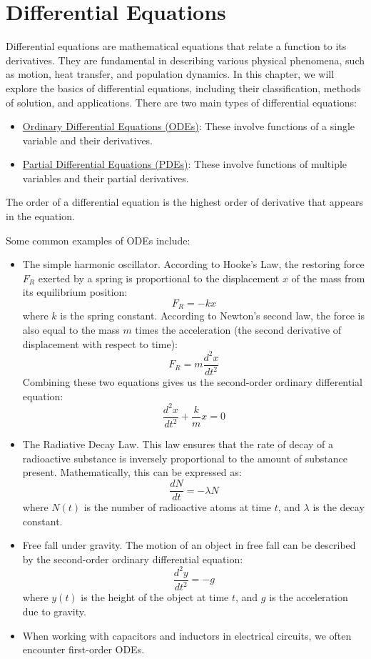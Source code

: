 \chapter{Differential Equations}

Differential equations are mathematical equations that relate a function to its derivatives. They are fundamental in describing various physical phenomena, such as motion, heat transfer, and population dynamics. In this chapter, we will explore the basics of differential equations, including their classification, methods of solution, and applications. There are two main types of differential equations: 
\begin{itemize}
    \item \ul{Ordinary Differential Equations (ODEs)}: These involve functions of a single variable and their derivatives.

    \item \ul{Partial Differential Equations (PDEs)}: These involve functions of multiple variables and their partial derivatives.
\end{itemize}

\begin{definicion}
The order of a differential equation is the highest order of derivative that appears in the equation.
\end{definicion}

Some common examples of ODEs include:
\begin{itemize}
    \item The simple harmonic oscillator. According to Hooke's Law, the restoring force $F_R$ exerted by a spring is proportional to the displacement $x$ of the mass from its equilibrium position:
    \[
        F_R = -kx
    \]
    where $k$ is the spring constant. According to Newton's second law, the force is also equal to the mass $m$ times the acceleration (the second derivative of displacement with respect to time):
    \[
        F_R = m \frac{d^2x}{dt^2}
    \]
    Combining these two equations gives us the second-order ordinary differential equation:
    \[
        \frac{d^2x}{dt^2} + \frac{k}{m}x = 0
    \]

    \item The Radiative Decay Law. This law ensures that the rate of decay of a radioactive substance is inversely proportional to the amount of substance present. Mathematically, this can be expressed as:
    \[
        \frac{dN}{dt} = -\lambda N
    \]
    where $N(t)$ is the number of radioactive atoms at time $t$, and $\lambda$ is the decay constant.

    \item Free fall under gravity. The motion of an object in free fall can be described by the second-order ordinary differential equation:
    \[
        \frac{d^2y}{dt^2} = -g
    \]
    where $y(t)$ is the height of the object at time $t$, and $g$ is the acceleration due to gravity.

    \item When working with capacitors and inductors in electrical circuits, we often encounter first-order ODEs.
\end{itemize}

